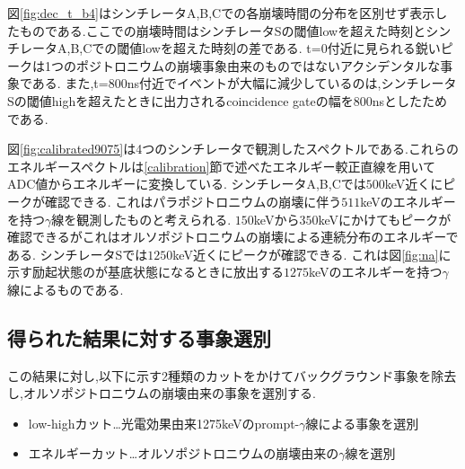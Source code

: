 図\ref{fig:dec_t_b4}はシンチレータA,B,Cでの各崩壊時間の分布を区別せず表示したものである.ここでの崩壊時間はシンチレータSの閾値lowを超えた時刻とシンチレータA,B,Cでの閾値lowを超えた時刻の差である.
t=0付近に見られる鋭いピークは1つのポジトロニウムの崩壊事象由来のものではないアクシデンタルな事象である.
また,t=800ns付近でイベントが大幅に減少しているのは,シンチレータSの閾値highを超えたときに出力されるcoincidence gateの幅を800nsとしたためである.

図\ref{fig:calibrated9075}は4つのシンチレータで観測したスペクトルである.これらのエネルギースペクトルは\ref{calibration}節で述べたエネルギー較正直線を用いてADC値からエネルギーに変換している.
シンチレータA,B,Cでは$500$keV近くにピークが確認できる.
これはパラポジトロニウムの崩壊に伴う$511$keVのエネルギーを持つ$\gamma$線を観測したものと考えられる.
$150$keVから$350$keVにかけてもピークが確認できるがこれはオルソポジトロニウムの崩壊による連続分布のエネルギーである.
シンチレータSでは$1250$keV近くにピークが確認できる.
これは図\ref{fig:na}に示す励起状態のが基底状態になるときに放出する$1275$keVのエネルギーを持つ$\gamma$線によるものである.

\subsection{得られた結果に対する事象選別}
この結果に対し,以下に示す2種類のカットをかけてバックグラウンド事象を除去し,オルソポジトロニウムの崩壊由来の事象を選別する.
\begin{itemize}
	\item low-highカット…光電効果由来1275keVのprompt-$\gamma$線による事象を選別
	\item エネルギーカット…オルソポジトロニウムの崩壊由来の$\gamma$線を選別
\end{itemize}

